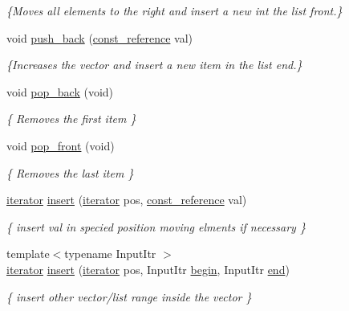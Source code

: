 \begin{DoxyCompactItemize}
\begin{DoxyCompactList}\small\item\em \{Moves all elements to the right and insert a new int the list front.\} \end{DoxyCompactList}\item 
void \hyperlink{classvector_a682f781951d464b9066fa0102d42533a}{push\+\_\+back} (\hyperlink{classvector_aad263433b4072dfbc26ace0df6441960}{const\+\_\+reference} val)
\begin{DoxyCompactList}\small\item\em \{Increases the vector and insert a new item in the list end.\} \end{DoxyCompactList}\item 
\mbox{\label{classvector_a0f163a88a6b18f6b7649aff1523d7a7b}} 
void \hyperlink{classvector_a0f163a88a6b18f6b7649aff1523d7a7b}{pop\+\_\+back} (void)
\begin{DoxyCompactList}\small\item\em \{ Removes the first item \} \end{DoxyCompactList}\item 
\mbox{\label{classvector_a67b45bb661cf068a17dd4dc55853c6c7}} 
void \hyperlink{classvector_a67b45bb661cf068a17dd4dc55853c6c7}{pop\+\_\+front} (void)
\begin{DoxyCompactList}\small\item\em \{ Removes the last item \} \end{DoxyCompactList}\item 
\hyperlink{classMyIterator}{iterator} \hyperlink{classvector_a95e4321c6149aa10403ffac1211b6205}{insert} (\hyperlink{classMyIterator}{iterator} pos, \hyperlink{classvector_aad263433b4072dfbc26ace0df6441960}{const\+\_\+reference} val)
\begin{DoxyCompactList}\small\item\em \{ insert val in specied position moving elments if necessary \} \end{DoxyCompactList}\item 
{\footnotesize template$<$typename Input\+Itr $>$ }\\\hyperlink{classMyIterator}{iterator} \hyperlink{classvector_a2d147bbf19573f256d0dfcafd909295b}{insert} (\hyperlink{classMyIterator}{iterator} pos, Input\+Itr \hyperlink{classvector_a22ebe2c584d5e94106e10eef4e8d7baa}{begin}, Input\+Itr \hyperlink{classvector_aad5e92e775a9fa4f98b5b0666b6c0e2d}{end})
\begin{DoxyCompactList}\small\item\em \{ insert other vector/list range inside the vector \} \end{DoxyCompactList}\item 

\end{DoxyCompactItemize}
